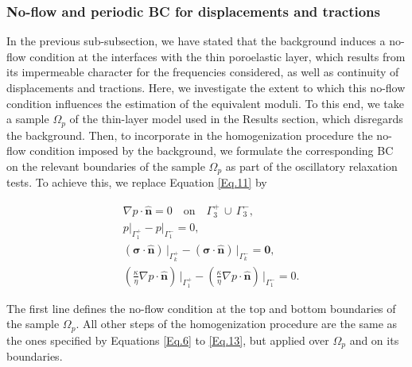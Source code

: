 \documentclass[draft]{agujournal2019}
\begin{document}
\subsubsection{No-flow and periodic BC for displacements and tractions} 
In the previous sub-subsection, we have stated that the background induces a no-flow condition at the interfaces with the thin poroelastic layer, which results from its impermeable character for the frequencies considered, as well as continuity of displacements and tractions. Here, we investigate the extent to which this no-flow condition influences the estimation of the equivalent moduli. To this end, we  take a sample $\Omega_p$ of the thin-layer model used in the Results section, which disregards the background. Then, to incorporate in the homogenization procedure the no-flow condition imposed by the background, we formulate the corresponding BC on the relevant boundaries of the sample $\Omega_p$ as part of the  oscillatory relaxation tests. To achieve this, we replace Equation \ref{Eq.11} by
\begin{linenomath*}
\begin{equation}\label{Eq.14}
\begin{split}
& \nabla p \cdot \bm{\hat n}  = 0 \quad \text{on}\quad \Gamma_3^+ \, \cup \, \Gamma_3^-,\\
& p\vert_{\Gamma_1^+}-p\vert_{\Gamma_1^-} =0, \\
& \left(\bm{\sigma}\cdot \bm{\hat n} \right)\, \vert_{\Gamma_k^+}-\left(\bm{\sigma}\cdot \bm{\hat n} \right)\, \vert_{\Gamma_k^-} = \bm{0},\\
&\left( \frac{\kappa}{\eta} \nabla p \cdot \bm{\hat n} \right) \, \vert_{\Gamma_1^+} -\left( \frac{\kappa}{\eta} \nabla p \cdot \bm{\hat n} \right) \, \vert_{\Gamma_1^-} = 0.
\end{split}
\end{equation}
\end{linenomath*}
The first line defines the no-flow condition at the top and bottom boundaries of the sample $\Omega_p$. All other steps of the homogenization procedure are the same as the ones specified by Equations \eqref{Eq.6} to \eqref{Eq.13}, but applied over $\Omega_p$ and on its boundaries.
\end{document}
